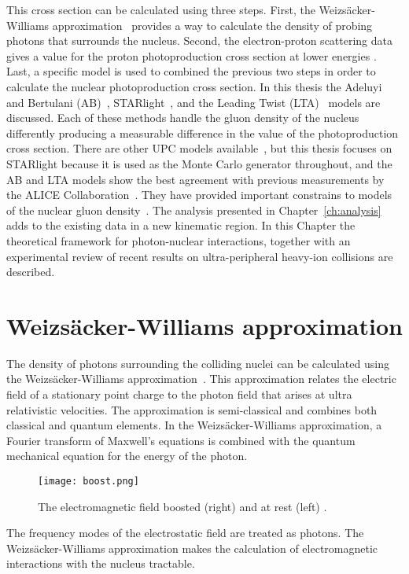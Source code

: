     This cross section can be calculated using three steps.   
    First, the Weizs\"{a}cker-Williams approximation~\cite{vonWeizsacker:1934sx,Williams:1934ad} provides a way to calculate the 
      density of probing photons that surrounds the nucleus. 
    Second, the electron-proton scattering data gives a value for the proton 
      photoproduction cross section at lower energies \cite{Klasen:2007pm}.
    Last, a specific model is used to combined the previous two steps in order
      to calculate the nuclear photoproduction cross section. 
    In this thesis the Adeluyi and Bertulani (AB)~\cite{pQCD2011.08,pQCD2013.02}, STARlight~\cite{vmd1999,starlight}, and 
      the Leading Twist (LTA)~\cite{Frankfurt:2011cs,lta2011.09} models are discussed. 
    Each of these methods handle the gluon density of the nucleus differently 
      producing a measurable difference in the value of the \JPsi{} 
      photoproduction cross section. 
    There are other UPC models available~\cite{Goncalves:2011vf,Cisek:2012yt,Lappi:2013am,Hufner:1996jw}, 
      but this thesis focuses on STARlight because it is used as the Monte 
      Carlo generator throughout, and the AB and LTA models 
      show the best agreement with previous measurements by the ALICE 
      Collaboration~\cite{Abelev:2012ba,Abbas:2013oua}. 
    They have provided important constrains to models of the nuclear gluon 
      density~\cite{lta2013.05}.
    The analysis presented in Chapter~\ref{ch:analysis} adds to the existing 
      data in a new kinematic region.
    In this Chapter the theoretical framework for photon-nuclear
      interactions, together with an experimental review of recent results on 
      ultra-peripheral heavy-ion collisions are described. 

  \section{Weizs\"{a}cker-Williams approximation \label{sec:wwAprox}}
    The density of photons surrounding the colliding nuclei can be calculated 
      using the Weizs\"{a}cker-Williams approximation~\cite{vonWeizsacker:1934sx,Williams:1934ad}. 
    This approximation relates the electric field of a stationary point charge 
      to the photon field that arises at ultra relativistic velocities. 
    The approximation is semi-classical and combines both classical and quantum 
      elements.
    In the Weizs\"{a}cker-Williams 
      approximation, a Fourier transform of Maxwell's equations is combined 
      with the quantum mechanical equation for the energy of the photon.   
    \begin{figure}[!Hhbt]
      \begin{center}
        \texttt{[image: boost.png]}
      \end{center}
      \caption{ \label{fig:boost} The electromagnetic field boosted (right) and at rest (left) \cite{WWJackson}.}
    \end{figure}
    The frequency modes of the electrostatic field are treated as photons. 
    The Weizs\"{a}cker-Williams approximation makes the calculation of 
      electromagnetic interactions with the nucleus tractable. 

